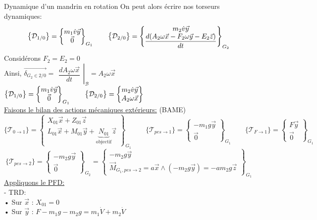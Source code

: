 \documentclass{article} %
\begin{document}
{\begin{exemple}{Dynamique d'un mandrin en rotation}
On peut alors écrire nos torseurs dynamiques:
$$\begin{Bmatrix}\mathcal{D}_{1/0}\end{Bmatrix}=\begin{Bmatrix}m_1 \dot{v}\vec{y}\\
\vec{0}\end{Bmatrix}_{G_1}\qquad \begin{Bmatrix}\mathcal{D}_{2/0}\end{Bmatrix}=\begin{Bmatrix}m_2 \dot{v}\vec{y}\\
\dfrac{d(A_2\omega \vec{x}-F_2\omega \vec{y}-E_2\vec{z})}{dt}\end{Bmatrix}_{G_2}$$
Considérons $F_2=E_2=0$\\
Ainsi, $\overrightarrow{\delta_{G_2 \in 2/0}}=\left.\begin{matrix}
\dfrac{dA_2\omega \vec{x}}{dt}
\end{matrix}\right|_\mathcal{B}=A_2\omega \vec{x}$\quad $\begin{Bmatrix}\mathcal{D}_{1/0}\end{Bmatrix}=\begin{Bmatrix}m_1 \dot{v}\vec{y}\\
\vec{0}\end{Bmatrix}_{G_1}\qquad \begin{Bmatrix}\mathcal{D}_{2/0}\end{Bmatrix}=\begin{Bmatrix}m_2 \dot{v}\vec{y}\\
A_2\omega \vec{x}\end{Bmatrix}$\\
\underline{Faisons le bilan des actions mécaniques extérieurs:} (BAME)
$$\{\mathcal{T}_{0 \to 1}\} = \left\{ \begin{array}{c} X_{01} \vec{x} + Z_{01} \vec{z} \\ L_{01} \vec{x} + M_{01} \vec{y} + \underbrace{N_{01}}_{\text{objectif}} \vec{z} \end{array} \right\}_{G_1} \qquad \{\mathcal{T}_{pes \to 1}\} = \left\{ \begin{array}{c} -m_1 g \vec{y} \\ \vec{0} \end{array} \right\}_{G_1} \qquad \{\mathcal{T}_{F \to 1}\} = \left\{ \begin{array}{c} F \vec{y} \\ \vec{0} \end{array} \right\}_{G_1}$$
$$\{\mathcal{T}_{pes \to 2}\} = \left\{ \begin{array}{c} -m_2 g \vec{y} \\ \vec{0} \end{array} \right\}_{G_2} = \left\{ \begin{array}{c} -m_2 g \vec{y} \\ \vec{M}_{G_1, pes \to 2} = a \vec{x} \wedge (-m_2 g \vec{y}) = -a m_2 g \vec{z} \end{array} \right\}_{G_1}$$
\underline{Appliquons le PFD:}\\
- TRD:\\
\hspace*{7pt}• Sur $\vec{x}$ : $X_{01} = 0$\\
\hspace*{7pt}• Sur $\vec{y}$ : $F - m_1 g - m_2 g = m_1 \dot{V} + m_2 \dot{V}$\\

\end{exemple}}
\end{document}
